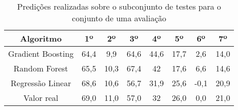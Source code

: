 \begin{table}[!htb]
    \centering
    \caption{Predições realizadas sobre o subconjunto de testes para o conjunto de uma avaliação}
    \begin{tabular}{cccccccc}
        \hline
        \textbf{Algoritmo} & \textbf{1º} & \textbf{2º} & \textbf{3º} & \textbf{4º} & \textbf{5º} & \textbf{6º} & \textbf{7º} \\ \hline
        Gradient Boosting & 64,4 & 9,9 & 64,6 & 44,6 & 17,7 & 2,6 & 14,0 \\
        Random Forest & 65,5 & 10,3 & 67,4 & 42 & 17,6 & 6,6 & 14,6 \\
        Regressão Linear & 68,6 & 10,6 & 56,7 & 31,9 & 25,6 & -0,1 & 20,9 \\
        Valor real & 69,0 & 11,0 & 57,0 & 32 & 26,0 & 0,0 & 21,0 \\ \hline
    \end{tabular}
    \label{tab:teste-1}
\end{table}